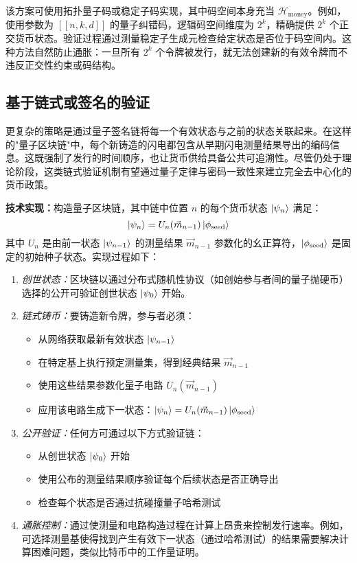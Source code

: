\documentclass[a4paper,10.5pt,twoside]{article}
\begin{document}
该方案可使用拓扑量子码或稳定子码实现，\autocite{Gottesman_Chuang_2001}其中码空间本身充当 $\mathcal{H}_{\text{money}}$。例如，使用参数为 $[[n,k,d]]$ 的量子纠错码，逻辑码空间维度为 $2^k$，精确提供 $2^k$ 个正交货币状态。验证过程通过测量稳定子生成元检查给定状态是否位于码空间内。\autocite{Nielsen_Chuang_2010}这种方法自然防止通胀：一旦所有 $2^k$ 个令牌被发行，就无法创建新的有效令牌而不违反正交性约束或码结构。

\subsection{基于链式或签名的验证}\label{s:3.3}
更复杂的策略是通过量子签名链将每一个有效状态与之前的状态关联起来。\autocite{Gottesman_Chuang_2001,Ben-David_Sattath_2017}在这样的"量子区块链"中，每个新铸造的闪电都包含从早期闪电测量结果导出的编码信息。这既强制了发行的时间顺序，也让货币供给具备公共可追溯性。尽管仍处于理论阶段，这类链式验证机制有望通过量子定律与密码一致性来建立完全去中心化的货币政策。

\textbf{技术实现：}构造量子区块链，其中链中位置 $n$ 的每个货币状态 $\ket{\psi_n}$ 满足：
\begin{equation}
\ket{\psi_n} = U_n(\vec{m}_{n-1}) \ket{\phi_{\text{seed}}}
\end{equation}
其中 $U_n$ 是由前一状态 $\ket{\psi_{n-1}}$ 的测量结果 $\vec{m}_{n-1}$ 参数化的幺正算符，$\ket{\phi_{\text{seed}}}$ 是固定的初始种子状态。实现过程如下：

\begin{enumerate}
\item \textit{创世状态：}区块链以通过分布式随机性协议（如创始参与者间的量子抛硬币）选择的公开可验证创世状态 $\ket{\psi_0}$ 开始。

\item \textit{链式铸币：}要铸造新令牌，参与者必须：
\begin{itemize}
    \item 从网络获取最新有效状态 $\ket{\psi_{n-1}}$
    \item 在特定基上执行预定测量集，得到经典结果 $\vec{m}_{n-1}$
    \item 使用这些结果参数化量子电路 $U_n(\vec{m}_{n-1})$
    \item 应用该电路生成下一状态：$\ket{\psi_n} = U_n(\vec{m}_{n-1}) \ket{\phi_{\text{seed}}}$
\end{itemize}

\item \textit{公开验证：}任何方可通过以下方式验证链：
\begin{itemize}
    \item 从创世状态 $\ket{\psi_0}$ 开始
    \item 使用公布的测量结果顺序验证每个后续状态是否正确导出
    \item 检查每个状态是否通过抗碰撞量子哈希测试
\end{itemize}

\item \textit{通胀控制：}通过使测量和电路构造过程在计算上昂贵来控制发行速率。例如，可选择测量基使得找到产生有效下一状态（通过哈希测试）的结果需要解决计算困难问题，类似比特币中的工作量证明。
\end{enumerate}
\end{document}
